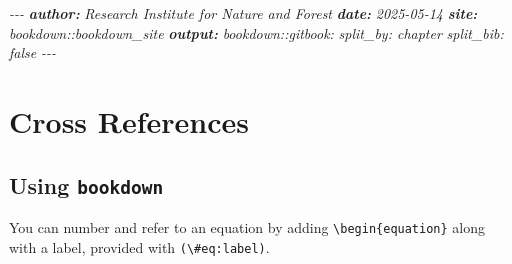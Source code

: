 \documentclass[
  a4paper,
  twoside,
  openright]{book}
\newenvironment{Shaded}{\begin{snugshade}}{\end{snugshade}}
\newcommand{\AnnotationTok}[1]{\textcolor[rgb]{0.56,0.35,0.01}{\textbf{\textit{#1}}}}
\newcommand{\CommentTok}[1]{\textcolor[rgb]{0.56,0.35,0.01}{\textit{#1}}}
\theoremstyle{definition}
\theoremstyle{definition}
\theoremstyle{definition}
\theoremstyle{definition}
\theoremstyle{remark}
\begin{document}
\begin{Shaded}
\begin{Highlighting}[]
\CommentTok{{-}{-}{-}}
\AnnotationTok{author:}\CommentTok{ Research Institute for Nature and Forest}
\AnnotationTok{date:}\CommentTok{ \textquotesingle{}2025{-}05{-}14\textquotesingle{}}
\AnnotationTok{site:}\CommentTok{ bookdown::bookdown\_site}
\AnnotationTok{output:}
\CommentTok{  bookdown::gitbook:}
\CommentTok{    split\_by: chapter}
\CommentTok{    split\_bib: false}
\CommentTok{{-}{-}{-}}
\end{Highlighting}
\end{Shaded}

\section{Cross References}\label{cross-references}

\subsection{\texorpdfstring{Using \texttt{bookdown}}{Using bookdown}}\label{using-bookdown}

You can number and refer to an equation by adding \texttt{\textbackslash{}begin\{equation\}} along with a label, provided with \texttt{(\textbackslash{}\#eq:label)}.
\end{document}
